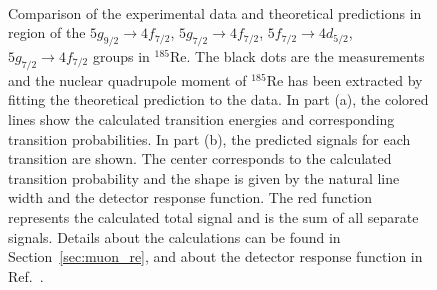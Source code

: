 \begin{figure}%
\centering
{}\\
\caption{
Comparison of the experimental data and theoretical predictions in region of the $5g_{9/2}\rightarrow4f_{7/2}$, $5g_{7/2}\rightarrow4f_{7/2}$, $5f_{7/2}\rightarrow4d_{5/2}$, $5g_{7/2}\rightarrow4f_{7/2}$ groups in $^{185}$Re. The black dots are the measurements and the nuclear quadrupole moment of $^{185}$Re has been extracted by fitting the theoretical prediction to the data. 
In part (a), the colored lines show the calculated transition energies and corresponding transition probabilities.
In part (b), the predicted signals for each transition are shown. The center corresponds to the calculated transition probability and the shape is given by the natural line width and the detector response function. The red function represents the calculated total signal and is the sum of all separate signals. Details about the calculations can be found in Section~\ref{sec:muon_re}, and about the detector response function in Ref.~\cite{vogiatzi2018}.
}
\label{fig:re54}
\end{figure}
